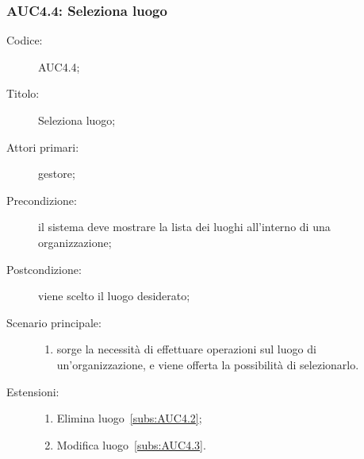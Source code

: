 \documentclass[../../../analisi-dei-requisiti.tex]{subfiles}
\begin{document}
\subsubsection{AUC4.4: Seleziona luogo}%
\label{subs:AUC4.4}
\begin{description}
  \item[Codice:] AUC4.4;
  \item[Titolo:] Seleziona luogo;
  \item[Attori primari:] gestore;
  \item[Precondizione:] il sistema deve mostrare la lista dei luoghi all'interno di una organizzazione;
  \item[Postcondizione:] viene scelto il luogo desiderato;
  \item[Scenario principale:]
  \begin{enumerate}
    \item sorge la necessità di effettuare operazioni sul luogo di un'organizzazione, e viene offerta la possibilità di selezionarlo.
  \end{enumerate}
  \item[Estensioni:]
  \begin{enumerate}
    \item Elimina luogo~\ref{subs:AUC4.2};
    \item Modifica luogo~\ref{subs:AUC4.3}.
  \end{enumerate}
\end{description}

\end{document}
